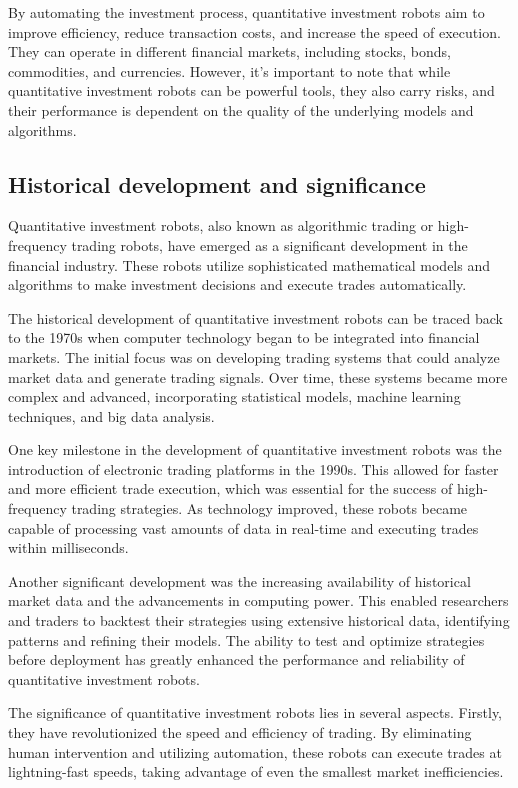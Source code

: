 \documentclass[UTF8]{ctexart}
\begin{document}
By automating the investment process, quantitative investment robots aim to improve efficiency, reduce transaction costs, and increase the speed of execution. They can operate in different financial markets, including stocks, bonds, commodities, and currencies. However, it's important to note that while quantitative investment robots can be powerful tools, they also carry risks, and their performance is dependent on the quality of the underlying models and algorithms.

\subsection{Historical development and significance}
Quantitative investment robots, also known as algorithmic trading or high-frequency trading robots, have emerged as a significant development in the financial industry. These robots utilize sophisticated mathematical models and algorithms to make investment decisions and execute trades automatically.

The historical development of quantitative investment robots can be traced back to the 1970s when computer technology began to be integrated into financial markets. The initial focus was on developing trading systems that could analyze market data and generate trading signals. Over time, these systems became more complex and advanced, incorporating statistical models, machine learning techniques, and big data analysis.

One key milestone in the development of quantitative investment robots was the introduction of electronic trading platforms in the 1990s. This allowed for faster and more efficient trade execution, which was essential for the success of high-frequency trading strategies. As technology improved, these robots became capable of processing vast amounts of data in real-time and executing trades within milliseconds.

Another significant development was the increasing availability of historical market data and the advancements in computing power. This enabled researchers and traders to backtest their strategies using extensive historical data, identifying patterns and refining their models. The ability to test and optimize strategies before deployment has greatly enhanced the performance and reliability of quantitative investment robots.

The significance of quantitative investment robots lies in several aspects. Firstly, they have revolutionized the speed and efficiency of trading. By eliminating human intervention and utilizing automation, these robots can execute trades at lightning-fast speeds, taking advantage of even the smallest market inefficiencies.
\end{document}
